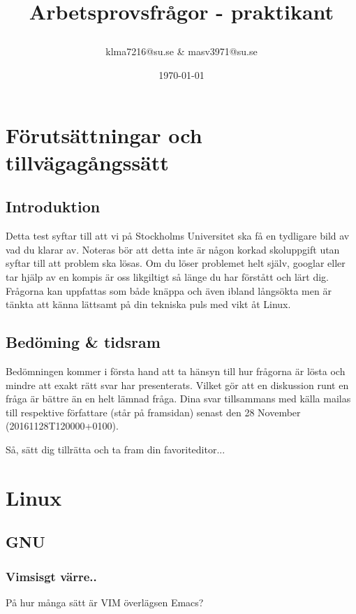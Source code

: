 \documentclass[a4paper]{report}
\title{Arbetsprovsfrågor - praktikant\date{\today}}
\author{klma7216@su.se \& masv3971@su.se}
\begin{document}
    \maketitle
    \newpage

\section{Förutsättningar och tillvägagångssätt}
\subsection{Introduktion}
Detta test syftar till att vi på Stockholms Universitet ska få en tydligare bild av vad du klarar av. Noteras bör att detta inte är någon korkad skoluppgift utan syftar till att problem ska lösas. Om du löser problemet helt själv, googlar eller tar hjälp av en kompis är oss likgiltigt så länge du har förstått och lärt dig. Frågorna kan uppfattas som både knäppa och även ibland långsökta men är tänkta att känna lättsamt på din tekniska puls med vikt åt Linux. 

\subsection{Bedöming \& tidsram}
Bedömningen kommer i första hand att ta hänsyn till hur frågorna är lösta och mindre att exakt rätt svar har presenterats. Vilket gör att en diskussion runt en fråga är bättre än en helt lämnad fråga. 
\newline
Dina svar tillsammans med källa  mailas till respektive författare (står på framsidan) senast den 28 November (20161128T120000+0100).
\newline
\newline

Så, sätt dig tillrätta och ta fram din favoriteditor...
    \newpage

\section{Linux}
\subsection{GNU}

\subsubsection{Vimsisgt värre..}
På hur många sätt är VIM överlägsen Emacs?
\end{document}
